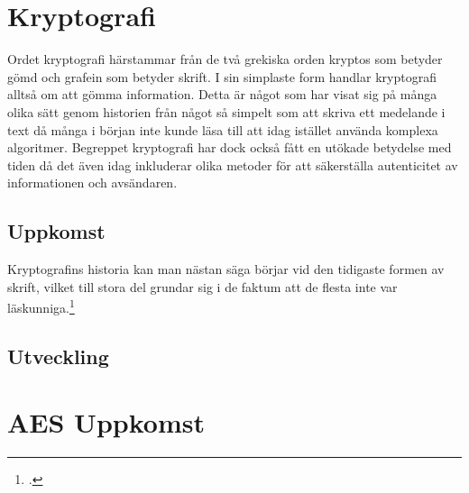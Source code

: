 
\section{Kryptografi} %
Ordet kryptografi härstammar från de två grekiska orden
kryptos som betyder gömd och grafein som betyder skrift.
I sin simplaste form handlar kryptografi alltså om att
gömma information. Detta är något som har visat sig på många
olika sätt genom historien från något så simpelt som att skriva
ett medelande i text då många i början inte kunde läsa till
att idag istället använda komplexa algoritmer.
Begreppet kryptografi har dock också fått en utökade betydelse
med tiden då det även idag inkluderar olika metoder för att
säkerställa autenticitet av informationen och avsändaren.

\subsection{Uppkomst} %
Kryptografins historia kan man nästan säga börjar vid den
tidigaste formen av skrift, vilket till stora del grundar
sig i de faktum att de flesta inte var läskunniga.\footcite{kryptografi-historia-1}

\subsection{Utveckling} %

\section{AES Uppkomst} %

